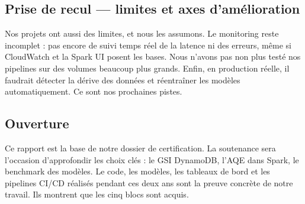 \documentclass[11pt]{article}
\begin{document}
\subsection{Prise de recul --- limites et axes d'amélioration}

Nos projets ont aussi des limites, et nous les assumons. Le monitoring reste
incomplet : pas encore de suivi temps réel de la latence ni des erreurs, même si
CloudWatch et la Spark UI posent les bases. Nous n'avons pas non plus testé nos
pipelines sur des volumes beaucoup plus grands. Enfin, en production réelle, il
faudrait détecter la dérive des données et réentraîner les modèles automatiquement.
Ce sont nos prochaines pistes.

\subsection{Ouverture}

Ce rapport est la base de notre dossier de certification. La soutenance sera
l'occasion d'approfondir les choix clés : le GSI DynamoDB, l'AQE dans Spark, le
benchmark des modèles. Le code, les modèles, les tableaux de bord et les pipelines
CI/CD réalisés pendant ces deux ans sont la preuve concrète de notre travail. Ils
montrent que les cinq blocs sont acquis.
\end{document}
